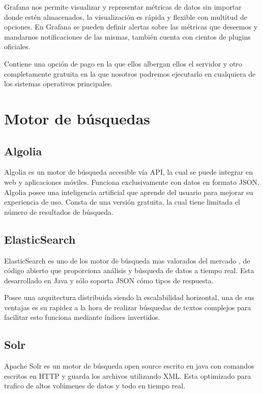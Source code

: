 Grafana nos permite visualizar y representar métricas de datos sin importar donde estén almacenados, la visualización es rápida y flexible con multitud de opciones. En Grafana se pueden definir alertas sobre las métricas que deseemos y mandarnos notificaciones de las mismas, también cuenta con cientos de plugins oficiales. 

Contiene una opción de pago en la que ellos albergan ellos el servidor y otro completamente gratuita en la que nosotros podremos ejecutarlo en cualquiera de los sistemas operativos principales.\cite{pagina:Grafana}

\section{Motor de búsquedas}

\subsection{Algolia}
Algolia es un motor de búsqueda accesible vía API, la cual se puede integrar en web y aplicaciones móviles. Funciona exclusivamente con datos en formato JSON. Algolia posee una inteligencia artificial que aprende del usuario para mejorar su experiencia de uso. Consta de una versión gratuita, la cual tiene limitada el número de resultados de búsqueda.\cite{pagina:Algolia}

\subsection{ElasticSearch}
ElasticSearch es uno de los motor de búsqueda mas valorados del mercado\cite{ranking:DB-Engines} , de código abierto que proporciona análisis y búsqueda de datos a tiempo real. Esta desarrollado en Java y sólo soporta JSON cómo tipos de respuesta.

Posee una arquitectura distribuida siendo la escalabilidad horizontal, una de sus ventajas es su rapidez a la hora de realizar búsquedas de textos complejos para facilitar esto funciona mediante índices invertidos.\cite{pagina:ElasticSearch}  


\subsection{Solr}
Apache Solr es un motor de búsqueda open source escrito en java con comandos escritos en HTTP y guarda los archivos utilizando XML. Esta optimizado para trafico de altos volúmenes de datos y todo en tiempo real.\cite{pagina:Solr} 

